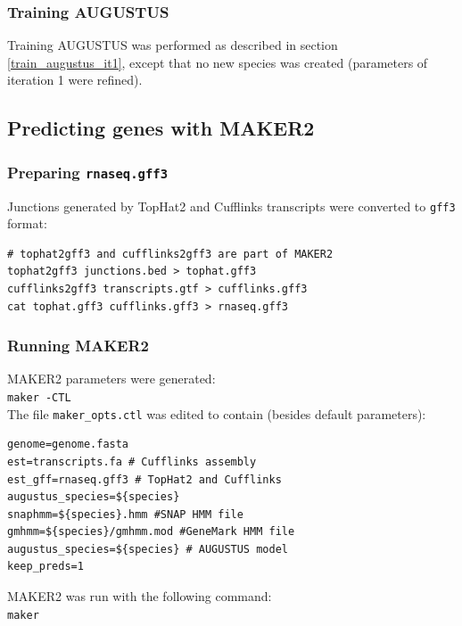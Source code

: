 \documentclass[a4paper,10pt]{report}
\begin{document}
\subsubsection{Training AUGUSTUS}

Training AUGUSTUS was performed as described in section \ref{train_augustus_it1}, except that no new species was created (parameters of iteration 1 were refined).

\subsection{Predicting genes with MAKER2}

\subsubsection{Preparing \texttt{rnaseq.gff3}}

Junctions generated by TopHat2 and Cufflinks transcripts were converted to \texttt{gff3} format:

\begin{verbatim}
# tophat2gff3 and cufflinks2gff3 are part of MAKER2
tophat2gff3 junctions.bed > tophat.gff3
cufflinks2gff3 transcripts.gtf > cufflinks.gff3
cat tophat.gff3 cufflinks.gff3 > rnaseq.gff3
\end{verbatim}


\subsubsection{Running MAKER2}

MAKER2 parameters were generated:\\

\noindent \texttt{maker -CTL}\\

\noindent The file \texttt{maker\_opts.ctl} was edited to contain (besides default parameters):

\begin{verbatim}
genome=genome.fasta
est=transcripts.fa # Cufflinks assembly
est_gff=rnaseq.gff3 # TopHat2 and Cufflinks
augustus_species=${species}
snaphmm=${species}.hmm #SNAP HMM file
gmhmm=${species}/gmhmm.mod #GeneMark HMM file
augustus_species=${species} # AUGUSTUS model
keep_preds=1
\end{verbatim}

\noindent MAKER2 was run with the following command:\\

\noindent \texttt{maker}\\
\end{document}
